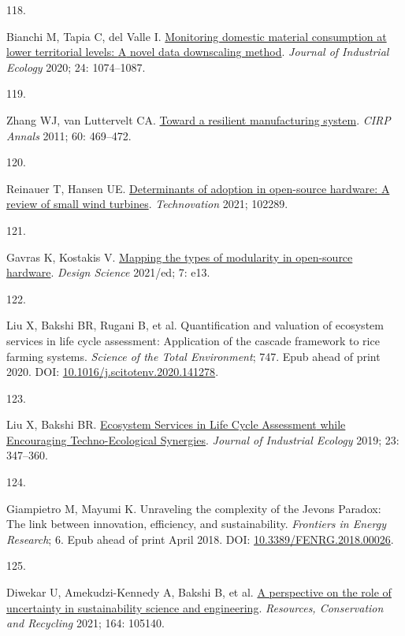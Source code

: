 \documentclass[
  11pt,
  a4paperpaper,
  onecolumn]{article}
\newlength{\cslhangindent}
\newlength{\csllabelwidth}
\newlength{\cslentryspacingunit} %
\newenvironment{CSLReferences}[2] %
 {%
  \setlength{\parindent}{0pt}
  \ifodd #1
  \let\oldpar\par
  \def\par{\hangindent=\cslhangindent\oldpar}
  \fi
  \setlength{\parskip}{#2\cslentryspacingunit}
 }%
 {}
\newcommand{\CSLLeftMargin}[1]{\parbox[t]{\csllabelwidth}{#1}}
\newcommand{\CSLRightInline}[1]{\parbox[t]{\linewidth - \csllabelwidth}{#1}\break}
\begin{document}
\begin{CSLReferences}{0}{0}
\leavevmode{}%
\CSLLeftMargin{118. }%
\CSLRightInline{Bianchi M, Tapia C, del Valle I.
\href{https://doi.org/10.1111/jiec.13000}{Monitoring domestic material
consumption at lower territorial levels: {A} novel data downscaling
method}. \emph{Journal of Industrial Ecology} 2020; 24: 1074--1087.}

\leavevmode{}%
\CSLLeftMargin{119. }%
\CSLRightInline{Zhang WJ, van Luttervelt CA.
\href{https://doi.org/10.1016/j.cirp.2011.03.041}{Toward a resilient
manufacturing system}. \emph{CIRP Annals} 2011; 60: 469--472.}

\leavevmode{}%
\CSLLeftMargin{120. }%
\CSLRightInline{Reinauer T, Hansen UE.
\href{https://doi.org/10.1016/j.technovation.2021.102289}{Determinants
of adoption in open-source hardware: {A} review of small wind turbines}.
\emph{Technovation} 2021; 102289.}

\leavevmode{}%
\CSLLeftMargin{121. }%
\CSLRightInline{Gavras K, Kostakis V.
\href{https://doi.org/10.1017/dsj.2021.11}{Mapping the types of
modularity in open-source hardware}. \emph{Design Science} 2021/ed; 7:
e13.}

\leavevmode{}%
\CSLLeftMargin{122. }%
\CSLRightInline{Liu X, Bakshi BR, Rugani B, et al. Quantification and
valuation of ecosystem services in life cycle assessment: {Application}
of the cascade framework to rice farming systems. \emph{Science of the
Total Environment}; 747. Epub ahead of print 2020. DOI:
\href{https://doi.org/10.1016/j.scitotenv.2020.141278}{10.1016/j.scitotenv.2020.141278}.}

\leavevmode{}%
\CSLLeftMargin{123. }%
\CSLRightInline{Liu X, Bakshi BR.
\href{https://doi.org/10.1111/jiec.12755}{Ecosystem {Services} in {Life
Cycle Assessment} while {Encouraging Techno}-{Ecological Synergies}}.
\emph{Journal of Industrial Ecology} 2019; 23: 347--360.}

\leavevmode{}%
\CSLLeftMargin{124. }%
\CSLRightInline{Giampietro M, Mayumi K. Unraveling the complexity of the
{Jevons Paradox}: {The} link between innovation, efficiency, and
sustainability. \emph{Frontiers in Energy Research}; 6. Epub ahead of
print April 2018. DOI:
\href{https://doi.org/10.3389/FENRG.2018.00026}{10.3389/FENRG.2018.00026}.}

\leavevmode{}%
\CSLLeftMargin{125. }%
\CSLRightInline{Diwekar U, Amekudzi-Kennedy A, Bakshi B, et al.
\href{https://doi.org/10.1016/j.resconrec.2020.105140}{A perspective on
the role of uncertainty in sustainability science and engineering}.
\emph{Resources, Conservation and Recycling} 2021; 164: 105140.}


\end{CSLReferences}
\end{document}
